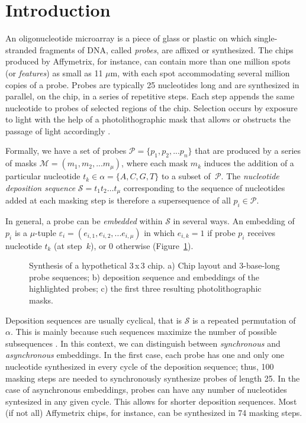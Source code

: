 \documentclass{bioinfo}
\begin{document}
\section{Introduction}

An oligonucleotide microarray is a piece of glass or plastic on which single-stranded fragments of DNA, called \emph{probes}, are affixed or synthesized. The chips produced by Affymetrix, for instance, can contain more than one million spots (or \emph{features}) as small as 11 $\mu$m, with each spot accommodating several million copies of a probe. Probes are typically 25 nucleotides long and are synthesized in parallel, on the chip, in a series of repetitive steps. Each step appends the same nucleotide to probes of selected regions of the chip. Selection occurs by exposure to light with the help of a photolithographic mask that allows or obstructs the passage of light accordingly \citep{FODOR91}.

Formally, we have a set of probes $\mathcal{P} = \{p_{1}, p_{2}, ... p_{n}\}$ that are produced by a series of masks $\mathcal{M} = (m_{1}, m_{2}, ... m_{\mu})$, where each mask $m_{k}$ induces the addition of a particular nucleotide $t_{k} \in \alpha = \{A, C, G, T\}$ to a subset of~$\mathcal{P}$. The \emph{nucleotide deposition sequence} $\mathcal{S} = t_{1} t_{2} \ldots t_{\mu}$ corresponding to the sequence of nucleotides added at each masking step is therefore a supersequence of all $p_{i} \in \mathcal{P}$.

In general, a probe can be \emph{embedded} within $\mathcal{S}$ in several ways. An embedding of $p_{i}$ is a $\mu$-tuple $\varepsilon_{i} = (e_{i,1}, e_{i,2}, ... e_{i,\mu})$ in which $e_{i,k} = 1$ if probe $p_{i}$ receives nucleotide $t_{k}$ (at step~$k$), or 0 otherwise (Figure~\ref{fig:masking_process}).

\begin{figure}
\caption{Synthesis of a hypothetical 3\,x\,3 chip. a) Chip layout and 3-base-long probe sequences; b) deposition sequence and embeddings of the highlighted probes; c) the first three resulting photolithographic masks.}
\label{fig:masking_process}
\end{figure}

Deposition sequences are usually cyclical, that is $\mathcal{S}$ is a repeated permutation of $\alpha$. This is mainly because such sequences maximize the number of possible subsequences \citep{CHASE76}. In this context, we can distinguish between \emph{synchronous} and \emph{asynchronous} embeddings. In the first case, each probe has one and only one nucleotide synthesized in every cycle of the deposition sequence; thus, 100 masking steps are needed to synchronously synthesize probes of length 25. In the case of asynchronous embeddings, probes can have any number of nucleotides syntesized in any given cycle. This allows for shorter deposition sequences. Most (if not all) Affymetrix chips, for instance, can be synthesized in 74 masking steps.
\end{document}
